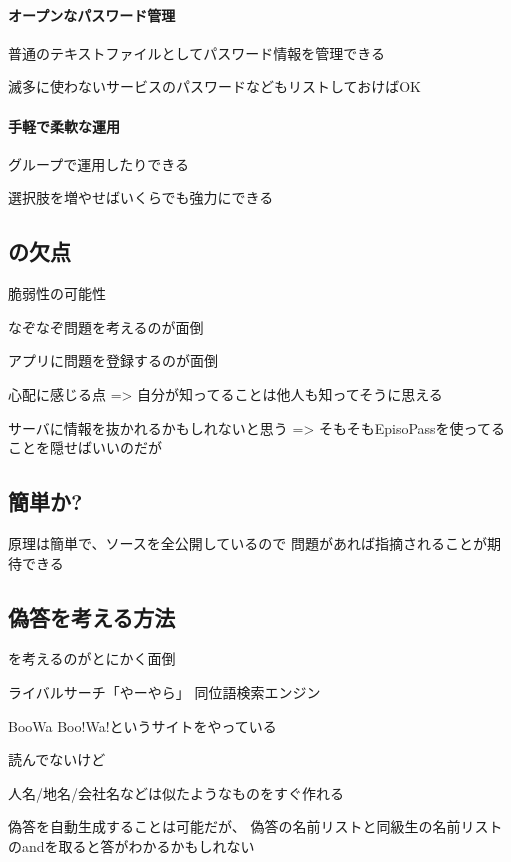 \documentclass[twoside]{wiss}
\begin{document}
\paragraph{オープンなパスワード管理}

普通のテキストファイルとしてパスワード情報を管理できる

滅多に使わないサービスのパスワードなどもリストしておけばOK

\paragraph{手軽で柔軟な運用}

グループで運用したりできる

選択肢を増やせばいくらでも強力にできる

\subsection{{\EP}の欠点}

脆弱性の可能性

なぞなぞ問題を考えるのが面倒

アプリに問題を登録するのが面倒

心配に感じる点
 => 自分が知ってることは他人も知ってそうに思える

サーバに情報を抜かれるかもしれないと思う
 => そもそもEpisoPassを使ってることを隠せばいいのだが

\subsection{簡単か?}

原理は簡単で、ソースを全公開しているので
問題があれば指摘されることが期待できる

\subsection{偽答を考える方法}

{\SQ}を考えるのがとにかく面倒

ライバルサーチ「やーやら」
同位語検索エンジン\cite{大島裕明:2006-12-15}

BooWa
\cite{Wang:2007:LSE:1441428.1442086}
Boo!Wa!というサイトをやっている\cite{BooWa}

\cite{Huang:2012:LFC:2426725.2426728}読んでないけど

人名/地名/会社名などは似たようなものをすぐ作れる

偽答を自動生成することは可能だが、
偽答の名前リストと同級生の名前リストのandを取ると答がわかるかもしれない
\end{document}

